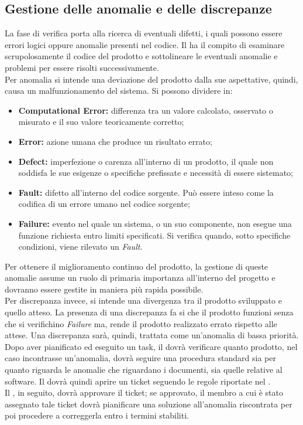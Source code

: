 	\subsection{Gestione delle anomalie e delle discrepanze}
	La fase di verifica porta alla ricerca di eventuali difetti, i quali possono essere errori logici oppure anomalie presenti nel codice. Il \roleVerifier{} ha il compito di esaminare scrupolosamente il codice del prodotto e sottolineare le eventuali anomalie e problemi per essere risolti successivamente.\\
	Per anomalia si intende una deviazione del prodotto dalla sue aspettative, quindi, causa un malfunzionamento del sistema. Si possono dividere in:
	\begin{itemize}
		\item \textbf{Computational Error:} differenza tra un valore calcolato, osservato o misurato e il suo valore teoricamente corretto;
		\item \textbf{Error:} azione umana che produce un risultato errato;
		\item \textbf{Defect:} imperfezione o carenza all'interno di un prodotto, il quale non soddisfa le sue esigenze o specifiche prefissate e necessità di essere sistemato;
		\item \textbf{Fault:} difetto all'interno del codice sorgente. Può essere inteso come la codifica di un errore umano nel codice sorgente;
		\item \textbf{Failure:} evento nel quale un sistema, o un suo componente, non esegue una funzione richiesta entro limiti specificati. Si verifica quando, sotto specifiche condizioni, viene rilevato un \emph{Fault}.
	\end{itemize}
	Per ottenere il miglioramento continuo del prodotto, la gestione di queste anomalie assume un ruolo di primaria importanza all'interno del progetto e dovranno essere gestite in maniera più rapida possibile.\\
	Per discrepanza invece, si intende una divergenza tra il prodotto sviluppato e quello atteso. La presenza di una discrepanza fa si che il prodotto funzioni senza che si verifichino \emph{Failure} ma, rende il prodotto realizzato errato rispetto alle attese. Una discrepanza sarà, quindi, trattata come un'anomalia di bassa priorità.\\
	Dopo aver pianificato ed eseguito un task, il \roleVerifier{} dovrà verificare quanto prodotto, nel caso incontrasse un'anomalia, dovrà seguire una procedura standard sia per quanto riguarda le anomalie che riguardano i documenti, sia quelle relative al software. Il \roleVerifier{} dovrà quindi aprire un ticket seguendo le regole riportate nel \docNameVersionNdP.\\
	Il \roleProjectManager , in seguito, dovrà approvare il ticket; se approvato, il membro a cui è stato assegnato tale ticket dovrà pianificare una soluzione all'anomalia riscontrata per poi procedere a correggerla entro i termini stabiliti.\\
	
	
	\pagebreak